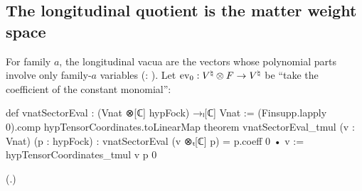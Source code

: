 \subsection{The longitudinal quotient is the matter weight space}

For family $a$, the longitudinal vacua are the vectors whose polynomial parts involve only family-$a$
variables (: ).  Let
$\mathrm{ev}_0:{V^{\natural}}\otimes F\to{V^{\natural}}$ be ``take the coefficient of the constant monomial'':
\begin{leancode}
def vnatSectorEval : (Vnat ⊗[ℂ] hypFock) →ₗ[ℂ] Vnat :=
  (Finsupp.lapply 0).comp hypTensorCoordinates.toLinearMap
theorem vnatSectorEval_tmul (v : Vnat) (p : hypFock) :
    vnatSectorEval (v ⊗ₜ[ℂ] p) = p.coeff 0 • v := hypTensorCoordinates_tmul v p 0
\end{leancode}
(.)

